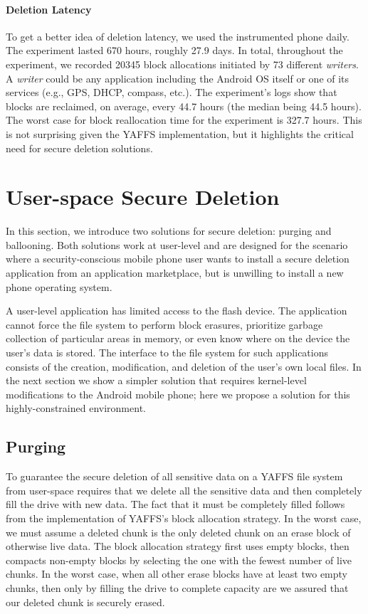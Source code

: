 \documentclass{acmtog}
\begin{document}
\paragraph{Deletion Latency}
To get a better idea of deletion latency,
we used the instrumented phone daily. The experiment
lasted 670 hours, roughly 27.9 days. In total, throughout the
experiment, we recorded 20345 block allocations initiated by 73 different
\emph{writers}. A \emph{writer} could be any application including the
Android OS itself or one of its services (e.g., GPS, DHCP, compass,
etc.). The experiment's logs show that blocks
are reclaimed, on average, every 44.7 hours (the median being 44.5
hours). The worst case for block reallocation time for the experiment
is 327.7 hours. This is not surprising given the YAFFS
implementation, but it highlights the critical need for secure deletion
solutions.

\section{User-space Secure Deletion}
In this section, we introduce two solutions for secure deletion: purging and
ballooning.
Both solutions work at user-level and are designed for
the scenario where a security-conscious mobile phone
user wants to install a secure deletion 
application from an application marketplace, 
but is unwilling to install a new phone operating system.

A user-level application has limited access to the flash device. The
application cannot force the file system to perform block erasures, prioritize garbage collection of particular areas in memory, or
even know where on the device the user's data is stored. The interface to the
file system for such applications consists of the 
creation, modification, and deletion of the user's own local
files. In the next section we show a simpler solution that
requires kernel-level modifications to the Android mobile phone; here 
we propose a solution for  this highly-constrained environment.

\newpage
\subsection{Purging}

To guarantee the secure deletion of all sensitive data on a
YAFFS file system from user-space requires that we delete all the
sensitive data and then completely
fill the drive with new data. 
The fact that it must be completely filled follows from the  implementation
of YAFFS's block allocation strategy. In the worst case, we must assume a deleted chunk is 
the only deleted chunk on an erase block of otherwise live data. The block allocation
strategy first uses empty blocks, then compacts non-empty blocks by selecting the one with the fewest number of 
live chunks. In the worst case, when all other erase blocks have at least two
empty chunks, then only by
filling the drive to complete capacity are we assured that our deleted chunk is securely erased.
\end{document}

